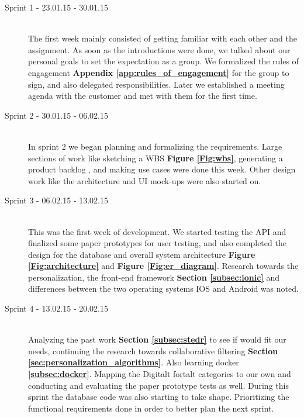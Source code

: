 \begin{description}
	
	\item[Sprint 1 - 23.01.15 - 30.01.15] \hfill \\ 
	The first week mainly consisted of getting familiar with each other and the assignment. As soon as the introductions were done, we talked about our personal goals to set the expectation as a group. We formalized the rules of engagement \textbf{Appendix \ref{app:rules_of_engagement}} for the group to sign, and also delegated responsibilities. Later we established a meeting agenda with the customer and met with them for the first time.
	
	\item[Sprint 2 - 30.01.15 - 06.02.15] \hfill \\ 
	In sprint 2 we began planning and formalizing the requirements. Large sections of work like sketching a WBS \textbf {Figure \ref{Fig:wbs}}, generating a product backlog , and making use cases were done this week. Other design work like the architecture and UI mock-ups were also started on.
	
	\item[Sprint 3 - 06.02.15 - 13.02.15] \hfill \\ 
	This was the first week of development. We started testing the API  and finalized some paper prototypes for user testing,  and also completed the design for the database and overall system architecture \textbf {Figure \ref{Fig:architecture}} and \textbf {Figure \ref{Fig:er_diagram}}. Research towards the personalization, the front-end framework \textbf{Section \ref{subsec:ionic}}  and differences between the two operating systems IOS and Android was noted.
	
	\item[Sprint 4 - 13.02.15 - 20.02.15] \hfill \\ 
	Analyzing the past work \textbf {Section \ref{subsec:stedr}} to see if would fit our needs, continuing the research towards collaborative filtering \textbf {Section \ref{sec:personalization_algorithms}}. Also learning docker \textbf {\ref{subsec:docker}}. Mapping the Digitalt fortalt  categories to our own and conducting and evaluating the paper prototype tests as well. During this sprint the database code was also starting to take shape. Prioritizing the functional requirements done in order to better plan the next sprint.  
	

\end{description}
